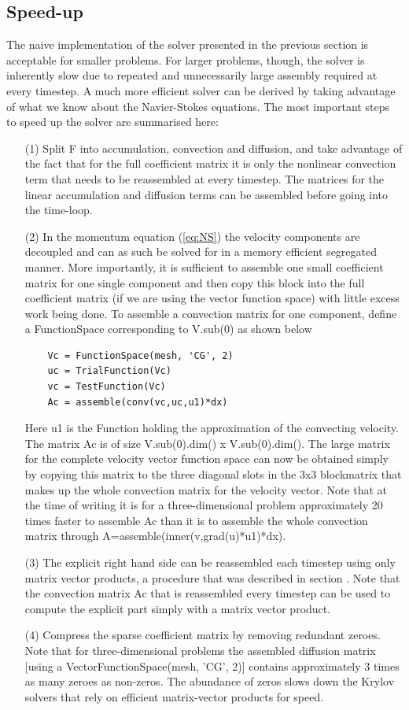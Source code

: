 \subsection{Speed-up}
The naive implementation of the solver presented in the previous
section is acceptable for smaller problems. For larger problems,
though, the solver is inherently slow due to repeated and
unnecessarily large assembly required at every timestep. A much more
efficient solver can be derived by taking advantage of what we know
about the Navier-Stokes equations. The most important steps to speed
up the solver are summarised here:
\begin{itemize}
 \item[(1)] Split F into accumulation, convection and diffusion,  and take advantage of the fact that for the full coefficient matrix it is only the nonlinear convection term that needs to be reassembled at every timestep. The matrices for the linear accumulation and diffusion terms can be assembled before going into the time-loop.
 \item[(2)] In the momentum equation (\ref{eq:NS}) the velocity components are decoupled and can as such be solved for in a memory efficient segregated manner. More importantly, it is sufficient to assemble one small coefficient matrix for one single component and then copy this block into the full coefficient matrix (if we are using the vector function space) with little excess work being done. To assemble a convection matrix for one component, define a FunctionSpace corresponding to V.sub(0) as shown below
\begin{small}
\begin{verbatim}
    Vc = FunctionSpace(mesh, 'CG', 2)
    uc = TrialFunction(Vc)
    vc = TestFunction(Vc)
    Ac = assemble(conv(vc,uc,u1)*dx)
\end{verbatim}
\end{small}
Here u1 is the Function holding the approximation of the convecting velocity. The matrix Ac is of size V.sub(0).dim() x V.sub(0).dim(). The large matrix for the complete velocity vector function space can now be obtained simply by copying this matrix to the three diagonal slots in the 3x3 blockmatrix that makes up the whole convection matrix for the velocity vector. Note that at the time of writing it is for a three-dimensional problem approximately 20 times faster to assemble Ac than it is to assemble the whole convection matrix through A=assemble(inner(v,grad(u)*u1)*dx).
\item[(3)] The explicit right hand side can be reassembled each timestep using only matrix vector products, a procedure that was described in section \cite{langtangen}. Note that the convection matrix Ac that is reassembled every timestep can be used to compute the explicit part simply with a matrix vector product.
\item[(4)] Compress the sparse coefficient matrix by removing redundant zeroes. Note that for three-dimensional problems the assembled diffusion matrix [using a VectorFunctionSpace(mesh, 'CG', 2)] contains approximately 3 times as many zeroes as non-zeros. The abundance of zeros slows down the Krylov solvers that rely on efficient matrix-vector products for speed.
\end{itemize}
